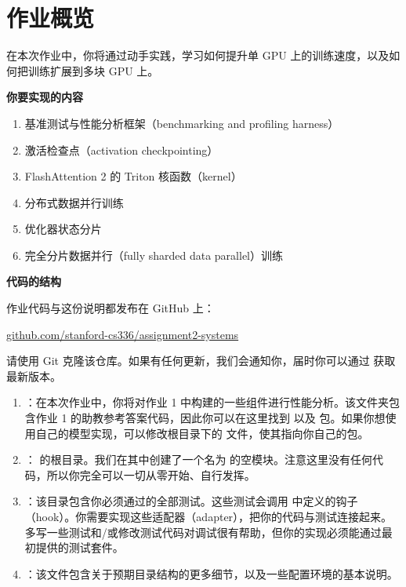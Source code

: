 
\section{作业概览}

在本次作业中，你将通过动手实践，学习如何提升单 GPU 上的训练速度，以及如何把训练扩展到多块 GPU 上。

\textbf{你要实现的内容}

\begin{enumerate}
  \item 基准测试与性能分析框架（benchmarking and profiling harness）
  \item 激活检查点（activation checkpointing）
  \item FlashAttention 2 的 Triton 核函数（kernel）
  \item 分布式数据并行训练
  \item 优化器状态分片
  \item 完全分片数据并行（fully sharded data parallel）训练
\end{enumerate}

\textbf{代码的结构}

作业代码与这份说明都发布在 GitHub 上：

\begin{center}
\url{github.com/stanford-cs336/assignment2-systems}
\end{center}

请使用 Git 克隆该仓库。如果有任何更新，我们会通知你，届时你可以通过  获取最新版本。

\begin{enumerate}
  \item {}：在本次作业中，你将对作业 1 中构建的一些组件进行性能分析。该文件夹包含作业 1 的助教参考答案代码，因此你可以在这里找到  以及  包。如果你想使用自己的模型实现，可以修改根目录下的  文件，使其指向你自己的包。
  \item \tm{/}： 的根目录。我们在其中创建了一个名为  的空模块。注意这里没有任何代码，所以你完全可以一切从零开始、自行发挥。
  \item {}：该目录包含你必须通过的全部测试。这些测试会调用  中定义的钩子（hook）。你需要实现这些适配器（adapter），把你的代码与测试连接起来。多写一些测试和/或修改测试代码对调试很有帮助，但你的实现必须能通过最初提供的测试套件。
  \item {}：该文件包含关于预期目录结构的更多细节，以及一些配置环境的基本说明。
\end{enumerate}

